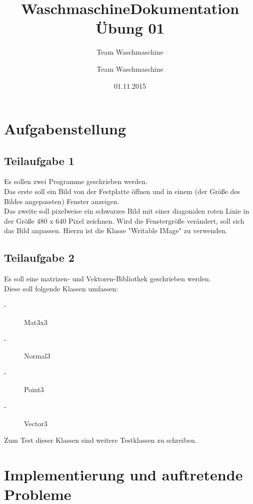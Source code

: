 \documentclass[a4paper, 10pt]{scrartcl}
\title{Waschmaschine}
\author{Team Waschmaschine}
\date{01.11.2015}
\begin{document}
\maketitle
\title{Dokumentation Übung 01}
\author{Team Waschmaschine}

\section{Aufgabenstellung}
\subsection{Teilaufgabe 1}

Es sollen zwei Programme geschrieben werden.\\
Das erste soll ein Bild von der Festplatte öffnen und in einem (der Größe des Bildes angepassten) Fenster anzeigen. \\
Das zweite soll pixelweise ein schwarzes Bild mit einer diagonalen roten Linie in der Größe 480 x 640 Pixel zeichnen. Wird die Fenstergröße verändert, soll sich das Bild anpassen. Hierzu ist die Klasse "Writable IMage" zu verwenden.\\

\subsection{Teilaufgabe 2}

Es soll eine matrizen- und Vektoren-Bibliothek geschrieben werden.\\
Diese soll folgende Klassen umfassen:
\begin{description}
\item[-]Mat3x3
\item[-]Normal3
\item[-]Point3
\item[-]Vector3
\end{description}
Zum Test dieser Klassen sind weitere Testklassen zu schreiben.

\newpage

\section{Implementierung und auftretende Probleme}
\end{document}
